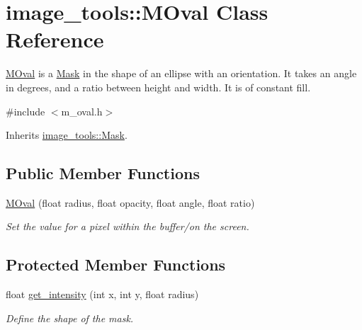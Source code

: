 \hypertarget{classimage__tools_1_1MOval}{}\section{image\+\_\+tools\+:\+:M\+Oval Class Reference}
\label{classimage__tools_1_1MOval}


\hyperlink{classimage__tools_1_1MOval}{M\+Oval} is a \hyperlink{classimage__tools_1_1Mask}{Mask} in the shape of an ellipse with an orientation. It takes an angle in degrees, and a ratio between height and width. It is of constant fill.  




{\ttfamily \#include $<$m\+\_\+oval.\+h$>$}



Inherits \hyperlink{classimage__tools_1_1Mask}{image\+\_\+tools\+::\+Mask}.

\subsection*{Public Member Functions}
\begin{DoxyCompactItemize}
\item 
\hyperlink{classimage__tools_1_1MOval_a07eb3a42c66b79837d5969310b7873ff}{M\+Oval} (float radius, float opacity, float angle, float ratio)\hypertarget{classimage__tools_1_1MOval_a07eb3a42c66b79837d5969310b7873ff}{}\label{classimage__tools_1_1MOval_a07eb3a42c66b79837d5969310b7873ff}

\begin{DoxyCompactList}\small\item\em Set the value for a pixel within the buffer/on the screen. \end{DoxyCompactList}\end{DoxyCompactItemize}
\subsection*{Protected Member Functions}
\begin{DoxyCompactItemize}
\item 
float \hyperlink{classimage__tools_1_1MOval_ae7767ec154487373d5944f2a02a834f0}{get\+\_\+intensity} (int x, int y, float radius)
\begin{DoxyCompactList}\small\item\em Define the shape of the mask. \end{DoxyCompactList}\end{DoxyCompactItemize}
